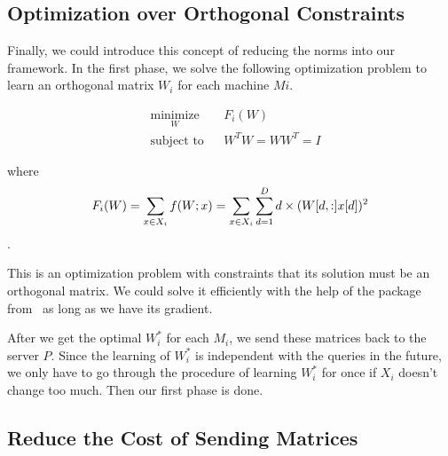 
\subsection{Optimization over Orthogonal Constraints} %
\label{ss:optimize_with_orthogonal_constraints}

Finally, we could introduce this concept of reducing the norms into our framework.  In the first phase, we solve the following optimization problem to learn an orthogonal matrix $W_i$ for each machine $Mi$.

\begin{equation}\label{objective-F}
\begin{aligned}
& \underset{W}{\text{minimize}}
& & F_i(W) \\
& \text{subject to}
& & W^{T}W=WW^{T}=I
\end{aligned}
\end{equation}

where 
\begin{equation}
	F_i(W)=\sum_{x \in X_i}{f(W;x)}\\
	=\sum_{x \in X_i}{ \sum^D_{d=1} {d\times(W[d,:]x[d])^2} }
\end{equation}.

This is an optimization problem with constraints that its solution must be an orthogonal matrix.  We could solve it efficiently with the help of the package from~\cite{Fopt} as long as we have its gradient. 

After we get the optimal $W^*_i$ for each $M_i$, we send these matrices back to the server $P$.  Since the learning of $W^*_i$ is independent with the queries in the future, we only have to go through the procedure of learning $W^*_i$ for once if $X_i$ doesn't change too much.  Then our first phase is done.


\subsection{Reduce the Cost of Sending Matrices} %
\label{ss:reduce_the_cost_of_sending_matrices}

